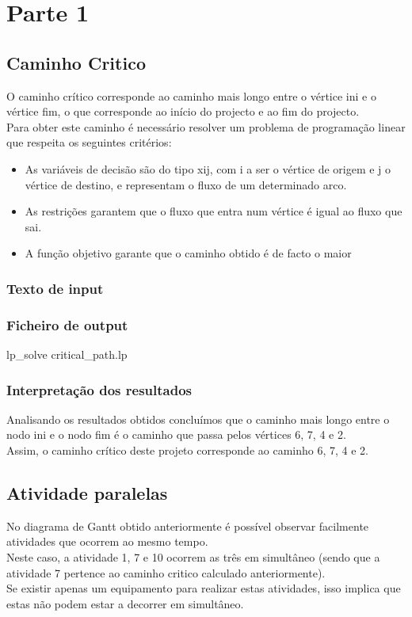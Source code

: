 \documentclass[a4paper]{report}
\begin{document}
\chapter{Parte 1}
\section{Caminho Critico}
O caminho crítico corresponde ao caminho mais longo entre o vértice ini e o
vértice fim, o que corresponde ao início do projecto e  ao fim do projecto.\\
Para obter este caminho é necessário resolver um problema de programação linear
que respeita os seguintes critérios:\\
\begin{itemize}
    \item As variáveis de decisão são do tipo xij, com i a ser o vértice de origem e j o
vértice de destino, e representam o fluxo de um determinado arco.
    \item As restrições garantem que o fluxo que entra num vértice é igual ao fluxo que
sai.
    \item A função objetivo garante que o caminho obtido é de facto o maior
\end{itemize}

\subsection{Texto de input}


\pagebreak
\subsection{Ficheiro de output}
\bash[stdout]
lp_solve critical_path.lp
\END

\subsection{Interpretação dos resultados}
Analisando os resultados obtidos concluímos que o caminho mais longo entre o
nodo ini e o nodo fim é o caminho que passa pelos vértices 6, 7, 4 e 2.\\
Assim, o caminho crítico deste projeto corresponde ao caminho 6, 7, 4 e 2.

\section{Atividade paralelas}
No diagrama de Gantt obtido anteriormente é possível observar facilmente
atividades que ocorrem ao mesmo tempo.\\
Neste caso, a atividade 1, 7 e 10 ocorrem as três em simultâneo (sendo que a
atividade 7 pertence ao caminho critico calculado anteriormente).\\
Se existir apenas um equipamento para realizar estas atividades, isso implica
que estas não podem estar a decorrer em simultâneo.
\end{document}
